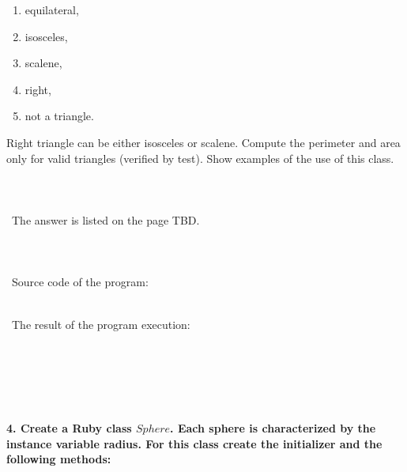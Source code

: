 \documentclass{article}
\begin{document}
\begin{enumerate}[label=(\arabic*)]
	\item equilateral,
	\item isosceles,
	\item scalene,
	\item right,
	\item not a triangle.
\end{enumerate}

Right triangle can be either isosceles or scalene. Compute the perimeter and area only for valid triangles (verified by test). Show examples of the use of this class.

\paragraph{}\
\paragraph{}\
	The answer is listed on the page TBD.
\paragraph{}\
\paragraph{}\
Source code of the program:

\begin{verbatim}

\end{verbatim}

\paragraph{}\
	The result of the program execution:
	
\begin{verbatim} 

\end{verbatim}


\paragraph{}\
\paragraph{}\



\paragraph{4. Create a Ruby class \(Sphere\). Each sphere is characterized by the instance variable radius. For this class create the initializer and the following methods: }\
\end{document}
